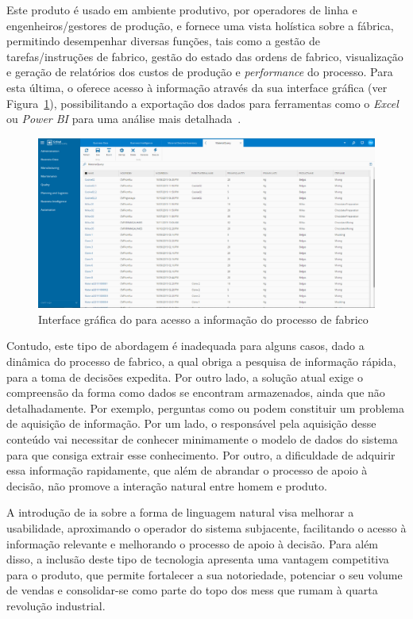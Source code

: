 Este produto é usado em ambiente produtivo, por operadores de linha e engenheiros/gestores de produção, e fornece uma vista holística sobre a fábrica, permitindo desempenhar diversas funções, tais como a gestão de tarefas/instruções de fabrico, gestão do estado das ordens de fabrico, visualização e geração de relatórios dos custos de produção e \textit{performance} do processo. Para esta última, o {\productname} oferece acesso à informação através da sua interface gráfica (ver Figura~\ref{fig:mes_view}), possibilitando a exportação dos dados para ferramentas como o \textit{Excel} ou \textit{Power BI} para uma análise mais detalhada~\parencite{cmf_services_bi}. 
%
\begin{figure}
    \centering
    \includegraphics[width=\textwidth]{ch02/assets/mes-view.png}
    \caption{Interface gráfica do {\productname} para acesso a informação do processo de fabrico}
    \label{fig:mes_view}
\end{figure}
%
Contudo, este tipo de abordagem é inadequada para alguns casos, dado a dinâmica do processo de fabrico, a qual  obriga a pesquisa de informação rápida, para a toma de decisões expedita. Por outro lado, a solução atual exige o compreensão da forma como dados se encontram armazenados, ainda que não detalhadamente. Por exemplo, perguntas como  ou  podem constituir um problema de aquisição de informação. Por um lado, o responsável pela aquisição desse conteúdo vai necessitar de conhecer minimamente o modelo de dados do sistema para que consiga extrair esse conhecimento. Por outro, a dificuldade de adquirir essa informação rapidamente, que além de abrandar o processo de apoio à decisão, não promove a interação natural entre homem e produto.

A introdução de \gls{ia} sobre a forma de linguagem natural visa melhorar a usabilidade, aproximando o operador do sistema subjacente, facilitando o acesso à informação relevante e melhorando o processo de apoio à decisão. Para além disso, a inclusão deste tipo de tecnologia apresenta uma vantagem competitiva para o produto, que permite fortalecer a sua notoriedade, potenciar o seu volume de vendas e consolidar-se como parte do topo dos \glspl{mes} que rumam à quarta revolução industrial.

